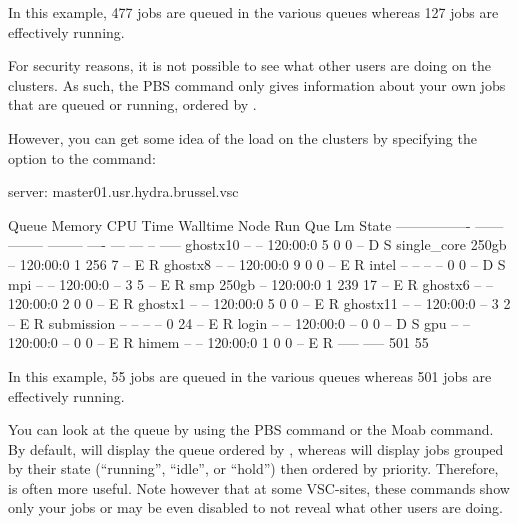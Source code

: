   In this example, 477 jobs are queued in the various queues whereas 127 jobs
  are effectively running.

\else
\ifbrussel
  For security reasons, it is not possible to see what other users are doing on
  the clusters. As such, the PBS  command only gives information
  about your own jobs that are queued or running, ordered by .

  However, you can get some idea of the load on the clusters by specifying
  the  option to the  command:

\begin{prompt}
server: master01.usr.hydra.brussel.vsc

Queue            Memory CPU Time Walltime Node  Run Que Lm  State
---------------- ------ -------- -------- ----  --- --- --  -----
ghostx10           --      --    120:00:0     5   0   0 --   D S
single_core       250gb    --    120:00:0     1 256   7 --   E R
ghostx8            --      --    120:00:0     9   0   0 --   E R
intel              --      --       --      --    0   0 --   D S
mpi                --      --    120:00:0   --    3   5 --   E R
smp               250gb    --    120:00:0     1 239  17 --   E R
ghostx6            --      --    120:00:0     2   0   0 --   E R
ghostx1            --      --    120:00:0     5   0   0 --   E R
ghostx11           --      --    120:00:0   --    3   2 --   E R
submission         --      --       --      --    0  24 --   E R
login              --      --    120:00:0   --    0   0 --   D S
gpu                --      --    120:00:0   --    0   0 --   E R
himem              --      --    120:00:0     1   0   0 --   E R
                                               ----- -----
                                                 501    55
\end{prompt}

  In this example, 55 jobs are queued in the various queues whereas 501 jobs
  are effectively running.

\else
  You can look at
  the queue by using the PBS  command or the Moab
   command. By default,  will display the queue
  ordered by , whereas  will display jobs grouped by
  their state (``running'', ``idle'', or ``hold'') then ordered by priority.
  Therefore,  is often more useful.
  Note however that at some VSC-sites, these commands show only your jobs or may
  be even disabled to not reveal what other users are doing.

